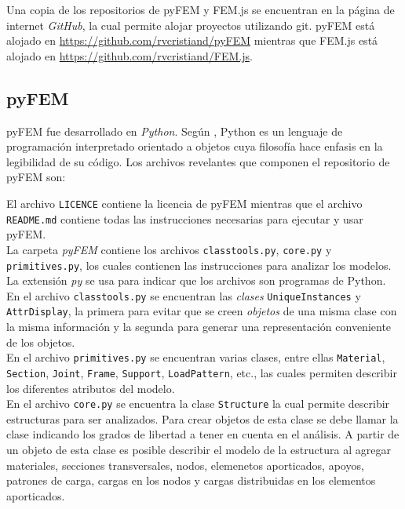 Una copia de los repositorios de pyFEM y FEM.js se encuentran en la página de internet \emph{GitHub}, la cual permite alojar proyectos utilizando git. pyFEM está alojado en \url{https://github.com/rvcristiand/pyFEM} mientras que FEM.js está alojado en \url{https://github.com/rvcristiand/FEM.js}.\\

\subsection{pyFEM}

pyFEM fue desarrollado en \emph{Python}. Según \cite{lutz2013python}, Python es un lenguaje de programación interpretado orientado a objetos cuya filosofía hace enfasis en la legibilidad de su código. Los archivos revelantes que componen el repositorio de pyFEM son:
\pagebreak

\bigskip
El archivo \verb|LICENCE| contiene la licencia de pyFEM mientras que el archivo \verb|README.md| contiene todas las instrucciones necesarias para ejecutar y usar pyFEM.\\

La carpeta \emph{pyFEM} contiene los archivos \verb|classtools.py|, \verb|core.py| y \verb|primitives.py|, los cuales contienen las instrucciones para analizar los modelos. La extensión \emph{py} se usa para indicar que los archivos son programas de Python.\\

En el archivo \verb|classtools.py| se encuentran las \emph{clases} \verb|UniqueInstances| y \verb|AttrDisplay|, la primera para evitar que se creen \emph{objetos} de una misma clase con la misma información y la segunda para generar una representación conveniente de los objetos.\\

En el archivo \verb|primitives.py| se encuentran varias clases, entre ellas \verb|Material|, \verb|Section|, \verb|Joint|, \verb|Frame|, \verb|Support|, \verb|LoadPattern|, etc., las cuales permiten describir los diferentes atributos del modelo.\\

En el archivo \verb|core.py| se encuentra la clase \verb|Structure| la cual permite describir estructuras para ser analizados. Para crear objetos de esta clase se debe llamar la clase indicando los grados de libertad a tener en cuenta en el análisis. A partir de un objeto de esta clase es posible describir el modelo de la estructura al agregar materiales, secciones transversales, nodos, elemenetos aporticados, apoyos, patrones de carga, cargas en los nodos y cargas distribuidas en los elementos aporticados.\\

